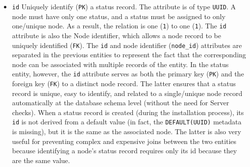 \begin{itemize}
  \item \texttt{id}
    \newline
    Uniquely identify (\texttt{PK}) a status record.
    \newline
    The attribute is of type \texttt{UUID}.
    \newline
    A node must have only one status, and a status must be assigned to only one/unique
    node. As a result, the relation is one (\texttt{1}) to one (\texttt{1}).
    \newline
    The \texttt{id} attribute is also the Node identifier, which allows a node
    record to be uniquely identified (\texttt{FK}). The \texttt{id} and node identifier
    (\texttt{node\_id}) attributes are separated in the previous entities to
    represent the fact that the corresponding node can be associated with
    multiple records of the entity. In the status entity, however, the \texttt{id}
    attribute serves as both the primary key (\texttt{PK}) and the foreign key (\texttt{FK})
    to a distinct node record. The latter ensures that a status record is unique,
    easy to identify, and related to a single/unique node record automatically at
    the database schema level (without the need for Server checks). When a
    status record is created (during the installation process), its \texttt{id}
    is not derived from a default value (in fact, the \texttt{DEFAULT(UUID)}
    metadata is missing), but it is the same as the associated node. The latter is
    also very useful for preventing complex and expensive joins between the two entities
    because identifying a node's status record requires only its id because they
    are the same value.


\end{itemize}
